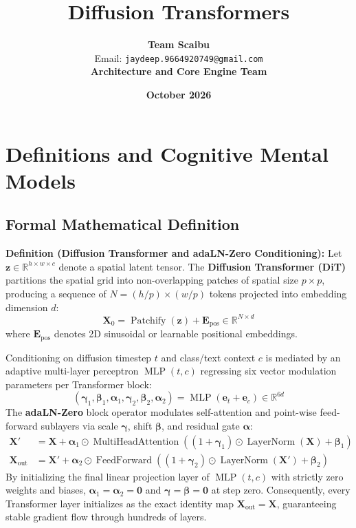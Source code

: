 \documentclass[11pt,a4paper]{article}
\title{\textbf{Diffusion Transformers}}
\author{\textbf{Team Scaibu} \\ \small Email: \texttt{jaydeep.9664920749@gmail.com} \\ \small \textbf{Architecture and Core Engine Team}}
\date{\textbf{October 2026}}
\theoremstyle{definition}
\begin{document}
\maketitle

\section{Definitions and Cognitive Mental Models}

\subsection{Formal Mathematical Definition}
\textbf{Definition (Diffusion Transformer and adaLN-Zero Conditioning):}
Let $\mathbf{z} \in \mathbb{R}^{h \times w \times c}$ denote a spatial latent tensor. The \textbf{Diffusion Transformer (DiT)} partitions the spatial grid into non-overlapping patches of spatial size $p \times p$, producing a sequence of $N = (h/p) \times (w/p)$ tokens projected into embedding dimension $d$:
{\boldmath
\begin{equation}
\mathbf{X}_0 = \operatorname{Patchify}(\mathbf{z}) + \mathbf{E}_{\text{pos}} \in \mathbb{R}^{N \times d}
\end{equation}
}
where $\mathbf{E}_{\text{pos}}$ denotes 2D sinusoidal or learnable positional embeddings.

Conditioning on diffusion timestep $t$ and class/text context $c$ is mediated by an adaptive multi-layer perceptron $\operatorname{MLP}(t, c)$ regressing six vector modulation parameters per Transformer block:
{\boldmath
\begin{equation}
(\boldsymbol{\gamma}_1, \boldsymbol{\beta}_1, \boldsymbol{\alpha}_1, \boldsymbol{\gamma}_2, \boldsymbol{\beta}_2, \boldsymbol{\alpha}_2) = \operatorname{MLP}(\mathbf{e}_t + \mathbf{e}_c) \in \mathbb{R}^{6d}
\end{equation}
}
The \textbf{adaLN-Zero} block operator modulates self-attention and point-wise feed-forward sublayers via scale $\boldsymbol{\gamma}$, shift $\boldsymbol{\beta}$, and residual gate $\boldsymbol{\alpha}$:
{\boldmath
\begin{align}
\mathbf{X}' &= \mathbf{X} + \boldsymbol{\alpha}_1 \odot \operatorname{MultiHeadAttention}\left( (1 + \boldsymbol{\gamma}_1) \odot \operatorname{LayerNorm}(\mathbf{X}) + \boldsymbol{\beta}_1 \right) \\
\mathbf{X}_{\text{out}} &= \mathbf{X}' + \boldsymbol{\alpha}_2 \odot \operatorname{FeedForward}\left( (1 + \boldsymbol{\gamma}_2) \odot \operatorname{LayerNorm}(\mathbf{X}') + \boldsymbol{\beta}_2 \right)
\end{align}
}
By initializing the final linear projection layer of $\operatorname{MLP}(t, c)$ with strictly zero weights and biases, $\boldsymbol{\alpha}_1 = \boldsymbol{\alpha}_2 = \mathbf{0}$ and $\boldsymbol{\gamma} = \boldsymbol{\beta} = \mathbf{0}$ at step zero. Consequently, every Transformer layer initializes as the exact identity map $\mathbf{X}_{\text{out}} = \mathbf{X}$, guaranteeing stable gradient flow through hundreds of layers.
\end{document}
